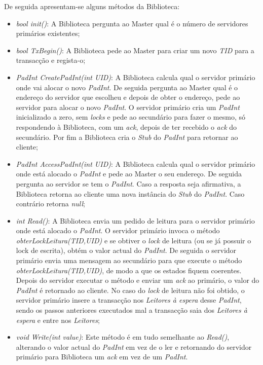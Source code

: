 De seguida apresentam-se alguns métodos da Biblioteca:
\begin{itemize}
	\item \textit{bool init()}: A Biblioteca pergunta ao Master qual é o número de servidores primários existentes;
	\item \textit{bool TxBegin()}: A Biblioteca pede ao Master para criar um novo \textit{TID} para a transacção e regista-o;
	\item \textit{PadInt CreatePadInt(int UID)}: A Biblioteca calcula qual o servidor primário onde vai alocar o novo \textit{PadInt}. De seguida pergunta ao Master qual é o endereço do servidor que escolheu e depois de obter o endereço, pede ao servidor para alocar o novo \textit{PadInt}. O servidor primário cria um \textit{PadInt} inicializado a zero, sem \textit{locks} e pede ao secundário para fazer o mesmo, só respondendo à Biblioteca, com um \textit{ack}, depois de ter recebido o \textit{ack} do secundário. Por fim a Biblioteca cria o \textit{Stub} do \textit{PadInt} para retornar ao cliente;
	\item \textit{PadInt AccessPadInt(int UID)}: A Biblioteca calcula qual o servidor primário onde está alocado o \textit{PadInt} e pede ao Master o seu endereço.  De seguida pergunta ao servidor se tem o \textit{PadInt}. Caso a resposta seja afirmativa, a Biblioteca retorna ao cliente uma nova instância do \textit{Stub} do \textit{PadInt}. Caso contrário retorna \textit{null};
	\item \textit{int Read()}: A Biblioteca envia um pedido de leitura para o servidor primário onde está alocado o \textit{PadInt}. O servidor primário invoca o método \textit{obterLockLeitura(TID,UID)} e se obtiver o \textit{lock} de leitura (ou se já possuir o lock de escrita), obtém o valor actual do \textit{PadInt}. De seguida o servidor primário envia uma mensagem ao secundário para que execute o método \textit{obterLockLeitura(TID,UID)}, de modo a que os estados fiquem coerentes. Depois do servidor executar o método e enviar um \textit{ack} ao primário, o valor do \textit{PadInt} é retornado ao cliente. No caso do \textit{lock} de leitura não foi obtido, o servidor primário insere a transacção nos \textit{Leitores à espera} desse \textit{PadInt}, sendo os passos anteriores executados mal a transacção saia dos \textit{Leitores à espera} e entre nos \textit{Leitores};
	\item \textit{void Write(int value)}: Este método é em tudo semelhante ao \textit{Read()}, alterando o valor actual do \textit{PadInt} em vez de o ler e retornando do servidor primário para Biblioteca um \textit{ack} em vez de um \textit{PadInt}.
\end{itemize}